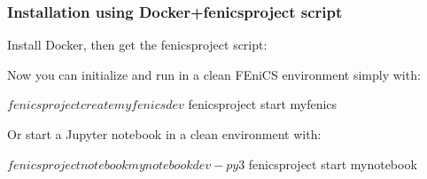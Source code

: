 \begin{frame}[fragile]
  \frametitle{Installation using Docker+fenicsproject script}

Install Docker, then get the fenicsproject script:

Now you can initialize and run in a clean FEniCS environment simply with:
  \begin{bash}
$ fenicsproject create myfenics dev
$ fenicsproject start myfenics
  \end{bash}

Or start a Jupyter notebook in a clean environment with:
  \begin{bash}
$ fenicsproject notebook mynotebook dev-py3
$ fenicsproject start mynotebook
  \end{bash}

\end{frame}
